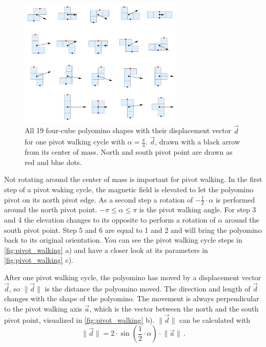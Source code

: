 \begin{figure}
	\centering
	\includegraphics[width=0.70\textwidth]{figures/displacement_pivot_walking.pdf}
	\caption[Polyomino shapes with different displacement vectors]{All 19 four-cube polyomino shapes with their displacement vector $\vec{d}$ for one pivot walking cycle with $\alpha = \frac{\pi}{4}$. $\vec{d}$, drawn with a black arrow from its center of mass. North and south pivot point are drawn as red and blue dots.}
	\label{fig:displacement_pivot_walking}
\end{figure}

Not rotating around the center of mass is important for pivot walking.
In the first step of a pivot waking cycle, the magnetic field is elevated to let the polyomino pivot on its north pivot edge.
As a second step a rotation of $-\frac{1}{2} \cdot \alpha$ is performed around the north pivot point.
$-\pi \leq \alpha \leq \pi$ is the pivot walking angle.
For step 3 and 4 the elevation changes to its opposite to perform a rotation of $\alpha$ around the south pivot point.
Step 5 and 6 are equal to 1 and 2 and will bring the polyomino back to its original orientation.
You can see the pivot walking cycle steps in \autoref{fig:pivot_walking} a) and have a closer look at its parameters in \autoref{fig:pivot_walking} c).

After one pivot walking cycle, the polyomino has moved by a displacement vector $\vec{d}$, so $\lVert \vec{d} \rVert$ is the distance the polyomino moved.
The direction and length of $\vec{d}$ changes with the shape of the polyomino.
The movement is always perpendicular to the pivot walking axis $\vec{a}$, which is the vector between the north and the south pivot point, visualized in \autoref{fig:pivot_walking} b).
$\lVert \vec{d} \rVert$ can be calculated with
\begin{equation}\label{eq:pwalk_dist}
\lVert \vec{d} \rVert = 2 \cdot \sin\left(\frac{1}{2} \cdot \alpha \right) \cdot \lVert \vec{a} \rVert \,.
\end{equation}

